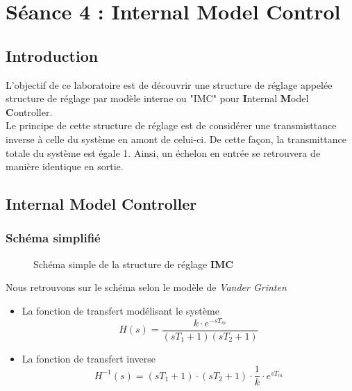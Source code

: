 \section{Séance 4 : Internal Model Control}
\subsection{Introduction}
L'objectif de ce laboratoire est de découvrir une structure de réglage appelée structure de réglage par modèle interne ou "IMC" pour \textbf{I}nternal \textbf{M}odel \textbf{C}ontroller.\\

Le principe de cette structure de réglage est de considérer une transmisttance inverse à celle du système en amont de celui-ci. De cette façon, la transmittance totale du système est égale 1. Ainsi, un échelon en entrée se retrouvera de manière identique en sortie.\\

\subsection{Internal Model Controller}
\subsubsection{Schéma simplifié}
\begin{figure}[H]

\caption{Schéma simple de la structure de réglage \textbf{IMC}}
\end{figure}

Nous retrouvons sur le schéma selon le modèle de \textit{Vander Grinten}
\begin{itemize}
\item La fonction de transfert modélisant le système 
\begin{equation}
H(s) = \frac{k \cdot e^{-sT_{m}}}{(sT_{1} + 1)(sT_{2} + 1)} 
\end{equation}

\item La fonction de transfert inverse
\begin{equation}
H^{-1}(s) = (sT_{1} + 1) \cdot (sT_{2} + 1) \cdot \frac{1}{k}\cdot e^{sT_{m}}
\end{equation} 
\end{itemize}

